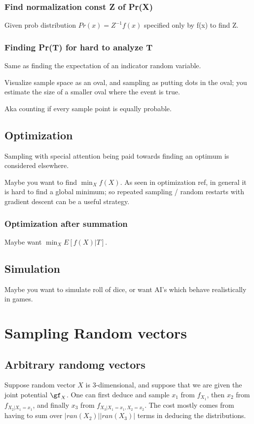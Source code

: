 \documentclass[oneside, article]{memoir}
\begin{document}
\subsubsection{Find normalization const Z of Pr(X)}
Given prob distribution $Pr(x) = Z^{-1}f(x)$ specified only by f(x) to find Z.

\subsubsection{Finding Pr(T) for hard to analyze T}
Same as finding the expectation of an indicator random variable.

Visualize sample space as an oval, and sampling as putting dots in the oval; you estimate the size of a smaller oval where the event is true.

Aka counting if every sample point is equally probable.

\subsection{Optimization}
Sampling with special attention being paid towards finding an optimum is considered elsewhere.

Maybe you want to find $\min_{X} f(X)$. As seen in optimization ref, in general it is hard to find a global minimum; so repeated sampling / random restarts with gradient descent can be a useful strategy.

\subsubsection{Optimization after summation}
Maybe want $\min_{X} E[f(X)|T]$.

\subsection{Simulation}
Maybe you want to simulate roll of dice, or want AI's which behave realistically in games.

\section{Sampling Random vectors}
\subsection{Arbitrary randomg vectors}
Suppose random vector $X$ is 3-dimensional, and suppose that we are given the joint potential $\gf_X$. One can first deduce and sample $x_1$ from $f_{X_1}$, then $x_2$ from $f_{X_2|X_1 = x_1}$, and finally $x_3$ from $f_{X_3|X_1 = x_1, X_2 = x_2}$. The cost mostly comes from having to sum over $|ran(X_2)||ran(X_3)|$ terms in deducing the distributions.
\end{document}
